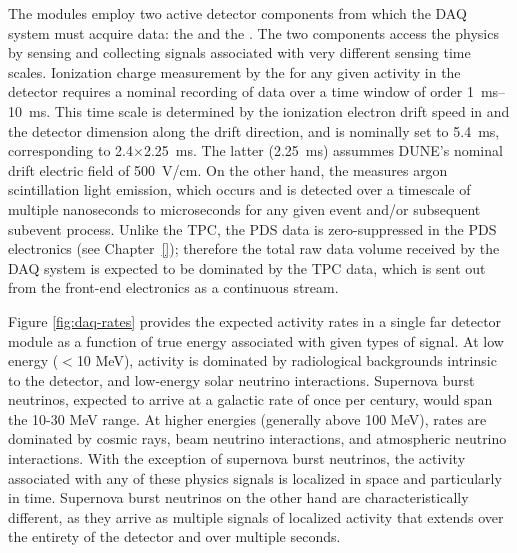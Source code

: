 The   modules employ two
active detector components from which the DAQ system must acquire
data: the  and the . The two components access the physics %
by sensing and collecting signals associated with very different 
sensing time scales.
Ionization charge measurement by the  for any given
activity in the detector requires a
nominal recording of data over a time window of order \SIrange{1}{10}{\milli\second}. 
This time scale is determined by the ionization electron drift speed in
\lar and the detector dimension along the drift direction, and is
nominally set to 5.4~ms, corresponding to 2.4$\times$\SI{2.25}{\milli\second}. The
latter (\SI{2.25}{\milli\second}) assummes DUNE's nominal drift electric field of 500~V/cm.
On the other hand, the  measures argon scintillation light emission, which
occurs and is detected over a timescale of multiple nanoseconds to
microseconds for
any given event and/or subsequent subevent process. Unlike the TPC,
the PDS data is zero-suppressed in
the PDS electronics (see Chapter~\ref{}); therefore the total raw data volume received by
the DAQ system is expected to be dominated by
the TPC data, which is sent out from the front-end electronics as a continuous stream.
 
Figure \ref{fig:daq-rates} provides the expected activity rates in a
single far detector module as a function of true energy associated
with given types of signal.
At low energy ($<$10 MeV), activity is dominated by radiological backgrounds
intrinsic to the detector, and
low-energy solar neutrino interactions. Supernova burst neutrinos,
expected to arrive at a galactic  rate of once per century, 
would span the 10-30 MeV range. At higher energies (generally
above 100 MeV), rates are dominated by cosmic rays, beam neutrino interactions,
and atmospheric neutrino interactions. With the exception of supernova
burst neutrinos, the activity associated with any of these physics
signals is localized in space and particularly in time. Supernova burst
neutrinos on the other hand are characteristically different, as they arrive as multiple
signals of localized activity that extends over the entirety of the
detector and over multiple seconds. %

